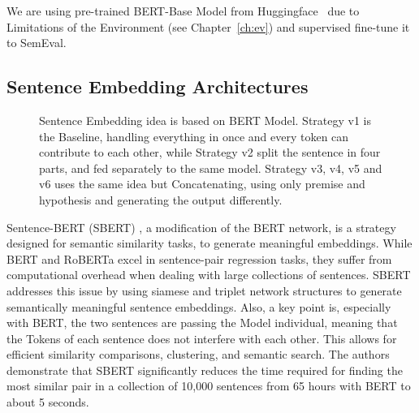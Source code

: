 We are using pre-trained BERT-Base Model from Huggingface~\cite{noauthor_hugging_2024-1} due to Limitations
of the Environment (see Chapter~\ref{ch:ev}) and supervised fine-tune it to SemEval.














\subsection{Sentence Embedding Architectures}\label{ch:seb}
\begin{figure}[!b]
    \vspace{-1cm}
    \centering
    \resizebox{\textwidth}{!}{}
    \caption{Sentence Embedding idea is based on BERT Model. Strategy v1 is the
             Baseline, handling everything in once and every token can contribute to each other, while
             Strategy v2 split the sentence in four parts, and fed separately to the same
             model. Strategy v3, v4, v5 and v6
             uses the same idea but Concatenating, using only premise and hypothesis and generating the output differently.}\label{fig:ver}
\end{figure}

Sentence-BERT (SBERT) \cite{reimers_sentence-bert_2019}, a modification of the BERT \cite{devlin_bert_2019} network, is a strategy designed for 
semantic similarity tasks, to generate meaningful embeddings. While BERT \cite{devlin_bert_2019} and RoBERTa \cite{liu_roberta_2019} excel in sentence-pair 
regression tasks, they suffer from computational overhead when dealing with large 
collections of sentences. SBERT addresses this issue by using 
siamese and triplet network structures to generate semantically meaningful 
sentence embeddings. Also, a key point is, especially with BERT, the two sentences are 
passing the Model individual, meaning that the Tokens of each sentence does not interfere
with each other. This allows for efficient similarity comparisons, 
clustering, and semantic search.
The authors demonstrate that SBERT significantly reduces the time required for 
finding the most similar pair in a collection of 10,000 sentences from 65 
hours with BERT to about 5 seconds.

